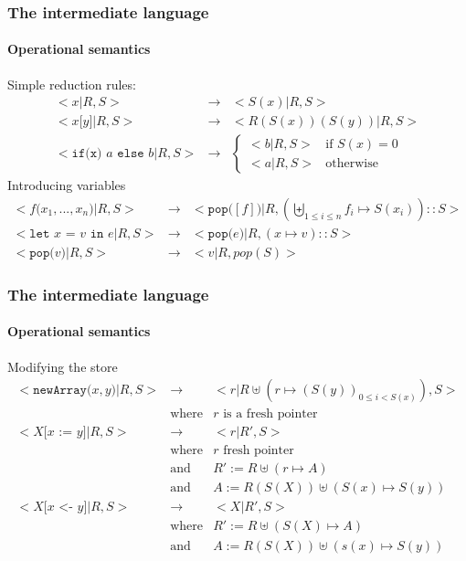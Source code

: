 \documentclass{beamer}
\newcommand{\cl}[1]{\texttt{#1}}
\begin{document}
\begin{frame}
\frametitle{The intermediate language}
\framesubtitle{Operational semantics}
Simple reduction rules:
\begin{eqnarray*}
<x | R, S> &\rightarrow& < S(x)|R,S> \\
<x \cl{[} y \cl{]} | R, S> &\rightarrow & < R(S(x))(S(y))|R,S> \\
<\cl{if(x) } a \cl{ else } b |R,S> &\rightarrow&
\left\lbrace \begin{array}{ll}
<b|R,S> & \text{if } S(x) = 0 \\
<a|R,S> & \text{otherwise}
\end{array} \right.
\end{eqnarray*}
Introducing variables
\begin{eqnarray*}
<f\cl{(} x_1, ... , x_n \cl{)} | R, S> &\rightarrow& < \cl{pop(} [f] \cl{)} | R, \left( \biguplus_{1 \leq i \leq n} f_i \mapsto S(x_i) \right) :: S > \\
<\cl{let } x \cl{ = } v \cl{ in } e | R, S> &\rightarrow& < \cl{pop(}e\cl{)}|R, (x \mapsto v) :: S > \\
<\cl{pop(} v \cl{)} | R, S> &\rightarrow& <v | R, pop(S) >
\end{eqnarray*}
\end{frame}



\begin{frame}
\frametitle{The intermediate language}
\framesubtitle{Operational semantics}
Modifying the store
\begin{eqnarray*}
<\cl{newArray(} x, y \cl{)} | R, S> &\rightarrow& <r| R\uplus \left( r \mapsto (S(y))_{0 \leq i < S(x)} \right), S> \\
&\text{where}& r \text{ is a fresh pointer} \\
< X \cl{[} x \cl{ := } y \cl{]} | R, S> &\rightarrow& < r| R', S> \\
&\text{where}& r \text{ fresh pointer} \\
&\text{and}& R' := R \uplus \left( r \mapsto A \right) \\
&\text{and}& A  := R( S(X) ) \uplus \left( S(x) \mapsto S(y) \right) \\
< X \cl{[} x \cl{ <- } y \cl{]} | R, S> &\rightarrow& < X| R', S> \\
&\text{where}& R' := R \uplus \left( S(X) \mapsto A \right) \\
&\text{and}&   A  := R( S(X) ) \uplus \left( s(x) \mapsto S(y) \right)
\end{eqnarray*}
\end{frame}
\end{document}
